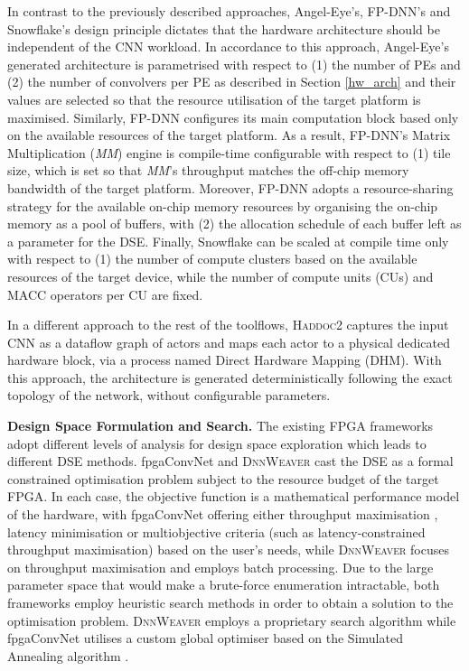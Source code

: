 \documentclass[format=acmsmall, review=false, screen=true]{acmart}
\begin{document}
In contrast to the previously described approaches, Angel-Eye's, FP-DNN's {\color{black} and Snowflake's} design principle dictates that the hardware architecture should be independent of the CNN workload. In accordance to this approach, Angel-Eye's generated architecture is parametrised with respect to (1) the number of PEs and (2) the number of convolvers per PE as described in Section \ref{hw_arch} and their values are selected so that the resource utilisation of the target platform is maximised. Similarly, FP-DNN configures its main computation block based only on the available resources of the target platform. As a result, FP-DNN's Matrix Multiplication (\textit{MM}) engine is compile-time configurable with respect to (1) tile size, which is set so that \textit{MM}'s throughput matches the off-chip memory bandwidth of the target platform. Moreover, FP-DNN adopts a resource-sharing strategy for the available on-chip memory resources by organising the on-chip memory as a pool of buffers, with (2) the allocation schedule of each buffer left as a parameter for the DSE. {\color{black}Finally, Snowflake can be scaled at compile time only with respect to (1) the number of compute clusters based on the available resources of the target device, while the number of compute units (CUs) and MACC operators per CU are fixed.}


{\color{black}In a different approach to the rest of the toolflows, \textsc{Haddoc2} captures the input CNN as a dataflow graph of actors and maps each actor to a physical dedicated hardware block, via a process named Direct Hardware Mapping (DHM). With this approach, the architecture is generated deterministically following the exact topology of the network, without configurable parameters.}


\textbf{Design Space Formulation and Search.} The existing FPGA frameworks adopt different levels of analysis for design space exploration which leads to different DSE methods. fpgaConvNet and \textsc{DnnWeaver} cast the DSE as a formal constrained optimisation problem subject to the resource budget of the target FPGA. In each case, the objective function is a mathematical performance model of the hardware, with fpgaConvNet offering either throughput maximisation \cite{Venieris_2016}, latency minimisation \cite{Venieris_2017b} or multiobjective criteria \cite{Venieris_2017c} (such as latency-constrained throughput maximisation) based on the user's needs, while \textsc{DnnWeaver} focuses on throughput maximisation and employs batch processing. Due to the large parameter space that would make a brute-force enumeration intractable, both frameworks employ heuristic search methods in order to obtain a solution to the optimisation problem. \textsc{DnnWeaver} employs a proprietary search algorithm while fpgaConvNet utilises a custom global optimiser based on the Simulated Annealing algorithm \cite{Reeves:1993:MHT:166648}.
\end{document}
